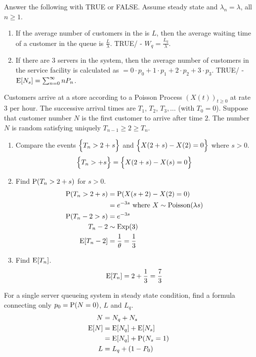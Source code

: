 \documentclass[12pt]{article}
\begin{document}
 \begin{question} Answer the following with TRUE or FALSE. Assume steady state and $\lambda_n = \lambda$, all $n \geq 1$. \begin{enumerate} 
 \item If the average number of customers in the \qs is $L$, then the average waiting time of a customer in the queue is $\frac{L}{\lambda}$. TRUE/ - $W_q = \frac{L_q}{\lambda}$. 
 \item If there are $3$ servers in the system, then the average number of customers in the service facility is calculated as $= 0\cdot p_0 + 1 \cdot p_1 + 2 \cdot p_2 + 3 \cdot p_3 $.  TRUE/ - $\mathrm{E}[ N_s ] = \sum_{n=0}^\infty nP_n$. 
 \end{enumerate} \end{question}
 
 \begin{question} Customers arrive at a store according to a Poisson Process $(X(t))_{t \geq 0}$ at rate $3$ per hour. The successive arrival times are $T_1$, $T_2$, $T_3, \dots$ (with $T_0 = 0$). Suppose that customer number $N$ is the first customer to arrive after time $2$. The number $N$ is random satisfying uniquely $T_{n-1} \geq 2 \geq T_n$. \\
 \begin{enumerate} 
 \item Compare the events $\Big\{ T_n > 2 + s \Big\}$ and $\Big\{ X(2 + s) - X(2) = 0 \Big\}$ where $s > 0$. $$ \Big\{ T_n > + s \Big\} = \Big\{ X(2+s) - X(s) = 0 \Big\} $$
 \item Find $\mathrm{P}( T_n > 2 + s )$ for $s > 0$. $$ \begin{aligned} \mathrm{P}( T_n > 2 + s ) &= \mathrm{P}( X(s+2) - X(2) = 0 ) \\ &= e^{-3s} \text{ where } X\sim \text{Poisson}(\lambda s) \\ \mathrm{P}( T_n - 2 > s ) &= e^{-3s} \\ T_n -2 &\sim \text{Exp}(3) \\ \mathrm{E}[ T_n-2 ] &= \frac{1}{\theta} = \frac{1}{3} \end{aligned} $$ 
 \item Find $\mathrm{E}[ T_n ]$. $$ \mathrm{E}[ T_n ] = 2 + \frac{1}{3} = \frac{7}{3}$$ 
 \end{enumerate} \end{question} 
  
  \begin{question} For a single server queueing system in steady state condition, find a formula connecting only $p_0 = \mathrm{P}( N = 0 )$, $L$ and $L_q$. 
  $$ \begin{aligned} N &= N_q + N_s \\ \mathrm{E}[ N ] &= \mathrm{E}[ N_q ] + \mathrm{E}[ N_s ] \\ &= \mathrm{E}[ N_q ] + \mathrm{P}( N_s = 1 ) \\ L &= L_q + (1-P_0) \end{aligned} $$ 
  \end{question} 
  
\end{document}
